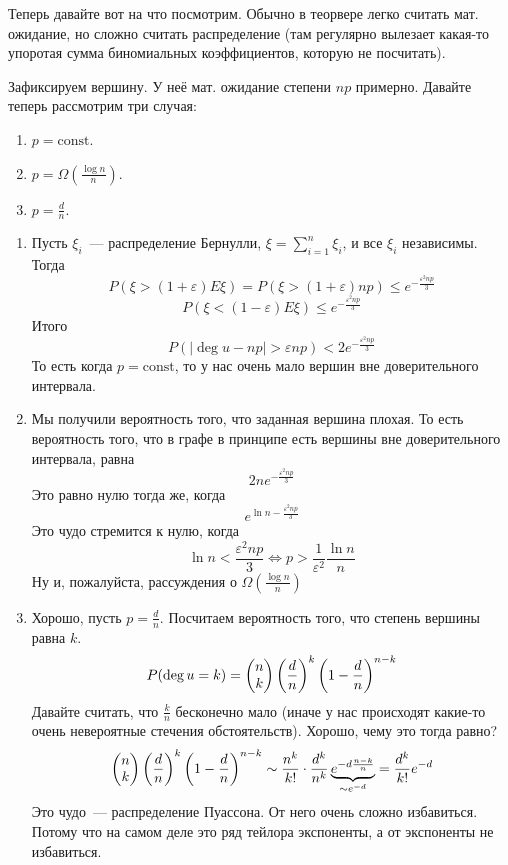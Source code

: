 \documentclass{article}
\begin{document}
    \begin{remark}
        Теперь давайте вот на что посмотрим. Обычно в теорвере легко считать мат. ожидание, но сложно считать распределение (там регулярно вылезает какая-то упоротая сумма биномиальных коэффициентов, которую не посчитать).
    \end{remark}
    \begin{example}
        Зафиксируем вершину. У неё мат. ожидание степени $np$ примерно. Давайте теперь рассмотрим три случая:
        \begin{enumerate}
            \item $p=\mathrm{const}$.
            \item $p=\Omega\left(\frac{\log n}n\right)$.
            \item $p=\frac dn$.
        \end{enumerate}
        \begin{enumerate}
            \item Пусть $\xi_i$~--- распределение Бернулли, $\xi=\sum\limits_{i=1}^n\xi_i$, и все $\xi_i$ независимы. Тогда
            $$
            P(\xi>(1+\varepsilon)E\xi)=P(\xi>(1+\varepsilon)np)\leqslant e^{-\frac{\varepsilon^2np}3}
            $$
            $$
            P(\xi<(1-\varepsilon)E\xi)\leqslant e^{-\frac{\varepsilon^2np}3}
            $$
            Итого
            $$
            P(|\deg u-np|>\varepsilon np)<2e^{-\frac{\varepsilon^2np}3}
            $$
            То есть когда $p=\mathrm{const}$, то у нас очень мало вершин вне доверительного интервала.
            \item Мы получили вероятность того, что заданная вершина плохая. То есть вероятность того, что в графе в принципе есть вершины вне доверительного интервала, равна
            $$
            2ne^{-\frac{\varepsilon^2np}3}
            $$
            Это равно нулю тогда же, когда
            $$
            e^{\ln n-\frac{\varepsilon^2np}3}
            $$
            Это чудо стремится к нулю, когда
            $$
            \ln n<\frac{\varepsilon^2np}3\Leftrightarrow p>\frac1{\varepsilon^2}\frac{\ln n}n
            $$
            Ну и, пожалуйста, рассуждения о $\Omega\left(\frac{\log n}n\right)$
            \item Хорошо, пусть $p=\frac dn$. Посчитаем вероятность того, что степень вершины равна $k$.
            $$
            P(\deg u=k)=\left(\begin{matrix}n\\k\end{matrix}\right)\left(\frac dn\right)^k\left(1-\frac dn\right)^{n-k}
            $$
            Давайте считать, что $\frac kn$ бесконечно мало (иначе у нас происходят какие-то очень невероятные стечения обстоятельств). Хорошо, чему это тогда равно?
            $$
            \left(\begin{matrix}n\\k\end{matrix}\right)\left(\frac dn\right)^k\left(1-\frac dn\right)^{n-k}\sim\frac{n^k}{k!}\cdot\frac{d^k}{n^k}\underbrace{e^{-d\frac{n-k}n}}_{\sim e^{-d}}=\frac{d^k}{k!}e^{-d}
            $$
            Это чудо~--- распределение Пуассона. От него очень сложно избавиться. Потому что на самом деле это ряд тейлора экспоненты, а от экспоненты не избавиться.
        \end{enumerate}
    \end{example}
\end{document}
